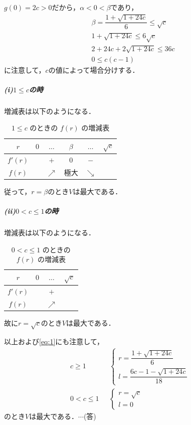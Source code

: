 \documentclass[../../main.tex]{subfiles}
\begin{document}
$g(0)=2c>0$だから，$\alpha<0<\beta$であり，
\begin{align}
  &\beta=\dfrac{1+\sqrt{1+24c}}{6}\le\sqrt{c} \\
  &1+\sqrt{1+24c}\le 6\sqrt{c} \\
  &2+24c+2\sqrt{1+24c}\le 36c \\
  &0\le c(c-1)
\end{align}
に注意して，$c$の値によって場合分けする．

\subparagraph{(i)$1\le c$の時}

増減表は以下のようになる．
\begin{table}[H]
  \centering
  \caption{$1\le c$ のときの $f(r)$ の増減表}
  \label{tab:variation_1_le_c}
  \begin{tabular}{c|c|c|c|c|c}
    $r$ & $0$ & $\dots$ & $\beta$ & $\dots$ & $\sqrt{c}$ \\ \hline
    $f'(r)$ & & $+$ & $0$ & $-$ & \\ \hline
    $f(r)$ & & $\nearrow$ & 極大 & $\searrow$ &
  \end{tabular}
\end{table}

従って，$r=\beta$のとき$V$は最大である．

\subparagraph{(ii)$0<c\le 1$の時}

増減表は以下のようになる．
\begin{table}[H]
  \centering
  \caption{$0<c\le 1$ のときの $f(r)$ の増減表}
  \label{tab:variation_0_lt_c_le_1}
  \begin{tabular}{c|c|c|c}
    $r$ & $0$ & $\dots$ & $\sqrt{c}$ \\ \hline
    $f'(r)$ & & $+$ & \\ \hline
    $f(r)$ & & $\nearrow$ &
  \end{tabular}
\end{table}

故に$r=\sqrt{c}$のとき$V$は最大である．
\casesend

以上および\cref{eq:1}にも注意して，
\begin{align}
  c\ge1&\,\,\,\,
  \begin{cases}
    r=\dfrac{1+\sqrt{1+24c}}{6} \\
    l=\dfrac{6c-1-\sqrt{1+24c}}{18}
  \end{cases}\\
  0<c\le1&\,\,\,\,
  \begin{cases}
    r=\sqrt{c} \\
    l=0
  \end{cases}
\end{align}
のとき$V$は最大である．$\cdots$(答)
\newpage
\end{document}
